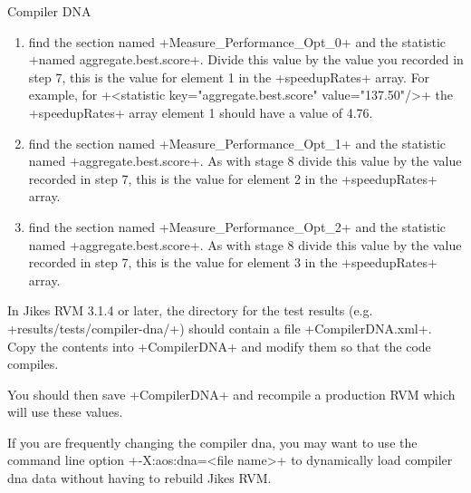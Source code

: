 \begin{section}{Compiler DNA}
\begin{enumerate}
    \item find the section named \spverb+Measure_Performance_Opt_0+ and the statistic \spverb+named aggregate.best.score+. Divide this value by the value you recorded in step 7, this is the value for element 1 in the \spverb+speedupRates+ array. For example, for \spverb+<statistic key="aggregate.best.score" value="137.50"/>+ the \spverb+speedupRates+ array element 1 should have a value of 4.76.
    \item find the section named \spverb+Measure_Performance_Opt_1+ and the statistic named \spverb+aggregate.best.score+. As with stage 8 divide this value by the value recorded in step 7, this is the value for element 2 in the \spverb+speedupRates+ array.
    \item find the section named \spverb+Measure_Performance_Opt_2+ and the statistic named \spverb+aggregate.best.score+. As with stage 8 divide this value by the value recorded in step 7, this is the value for element 3 in the \spverb+speedupRates+ array.
\end{enumerate}

In Jikes RVM 3.1.4 or later, the directory for the test results (e.g. \newline \spverb+results/tests/compiler-dna/+) should contain a file \spverb+CompilerDNA.xml+. Copy the contents into \spverb+CompilerDNA+ and modify them so that the code compiles.

You should then save \spverb+CompilerDNA+ and recompile a production RVM which will use these values.

If you are frequently changing the compiler dna, you may want to use the command line option \spverb+-X:aos:dna=<file name>+ to dynamically load compiler dna data without having to rebuild Jikes RVM.


\end{section}
